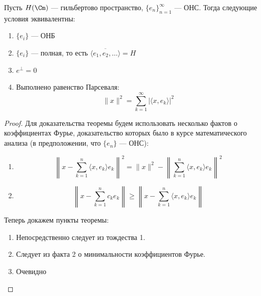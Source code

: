 \begin{theorem}
    Пусть \(H(\Cm)\) --- гильбертово пространство, \(\{e_n\}_{n = 1}^\infty\) --- ОНС. Тогда следующие условия эквивалентны:
    \begin{enumerate}
        \item \(\{e_i\}\) --- ОНБ
        \item \(\{e_i\}\) --- полная, то есть \(\overline{\langle e_1, e_2, \dots \rangle} = H\)
        \item \(e^\perp = 0\)
        \item Выполнено равенство Парсеваля:
        \[\|x\|^2 = \sum_{k = 1}^\infty |\langle x, e_k \rangle|^2\]
    \end{enumerate}
\end{theorem}
\begin{proof}
    Для доказательства теоремы будем использовать несколько фактов о коэффициентах Фурье, доказательство которых было в курсе математического анализа (в предположении, что \(\{e_n\}\) --- ОНС):

    \begin{enumerate}
        \item 
        \[\left\| x - \sum_{k = 1}^n \langle x, e_k \rangle e_k \right\|^2 = \|x\|^2 - \left\|\sum_{k = 1}^n \langle x, e_k \rangle e_k \right\|^2\]
        \item 
        \[\left\| x - \sum_{k = 1}^n c_ke_k \right\| \ge \left\| x - \sum_{k = 1}^n \langle x, e_k \rangle e_k \right\|\]
    \end{enumerate}
    
    Теперь докажем пункты теоремы:
    \begin{enumerate}
        \item[\((1) \Lra (4)\)] Непосредственно следует из тождества 1.
        \item[\((2) \Ra (1)\)] Следует из факта 2 о минимальности коэффициентов Фурье.
        \item[\((1) \Ra (2)\)] Очевидно
    \end{enumerate}
\end{proof}
